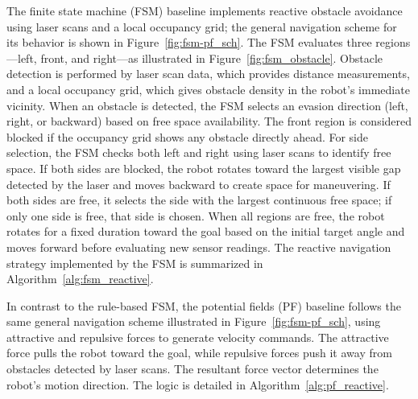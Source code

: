 \documentclass[robotics,article,submit,pdftex,moreauthors]{Definitions/mdpi}
\begin{document}
The finite state machine (FSM) baseline implements reactive obstacle avoidance using laser scans and a local occupancy grid; the general navigation scheme for its behavior is shown in Figure~\ref{fig:fsm-pf_sch}. The FSM evaluates three regions—left, front, and right—as illustrated in Figure~\ref{fig:fsm_obstacle}. Obstacle detection is performed by laser scan data, which provides distance measurements, and a local occupancy grid, which gives obstacle density in the robot's immediate vicinity. When an obstacle is detected, the FSM selects an evasion direction (left, right, or backward) based on free space availability. The front region is considered blocked if the occupancy grid shows any obstacle directly ahead. For side selection, the FSM checks both left and right using laser scans to identify free space. If both sides are blocked, the robot rotates toward the largest visible gap detected by the laser and moves backward to create space for maneuvering. If both sides are free, it selects the side with the largest continuous free space; if only one side is free, that side is chosen. When all regions are free, the robot rotates for a fixed duration toward the goal based on the initial target angle and moves forward before evaluating new sensor readings. The reactive navigation strategy implemented by the FSM is summarized in Algorithm~\ref{alg:fsm_reactive}.

In contrast to the rule-based FSM, the potential fields (PF) baseline follows the same general navigation scheme illustrated in Figure~\ref{fig:fsm-pf_sch}, using attractive and repulsive forces to generate velocity commands. The attractive force pulls the robot toward the goal, while repulsive forces push it away from obstacles detected by laser scans. The resultant force vector determines the robot's motion direction. The logic is detailed in Algorithm~\ref{alg:pf_reactive}.
\end{document}
